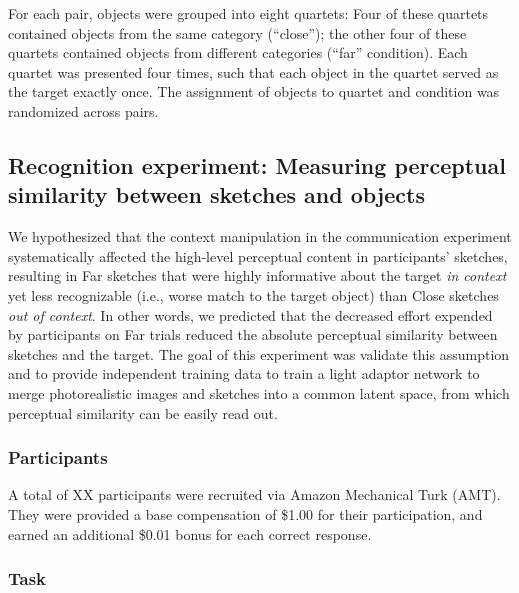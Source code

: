 \documentclass[9pt,twocolumn,twoside]{pnas-new}
\begin{document}
{For each pair, objects were grouped into eight quartets: Four of these quartets contained objects from the same category (``close''); the other four of these quartets contained objects from different categories (``far'' condition). Each quartet was presented four times, such that each object in the quartet served as the target exactly once. The assignment of objects to quartet and condition was randomized across pairs.

\subsection*{Recognition experiment: Measuring perceptual similarity between sketches and objects}

We hypothesized that the context manipulation in the communication experiment systematically affected the high-level perceptual content in participants' sketches, resulting in Far sketches that were highly informative about the target \textit{in context} yet less recognizable (i.e., worse match to the target object) than Close sketches \textit{out of context}. In other words, we predicted that the decreased effort expended by participants on Far trials reduced the absolute perceptual similarity between sketches and the target. The goal of this experiment was validate this assumption and to provide independent training data to train a light adaptor network to merge photorealistic images and sketches into a common latent space, from which perceptual similarity can be easily read out.

\subsubsection*{Participants}

A total of XX participants were recruited via Amazon Mechanical Turk (AMT). They were provided a base compensation of \$1.00 for their participation, and earned an additional \$0.01 bonus for each correct response.

\subsubsection*{Task}

}
\end{document}
